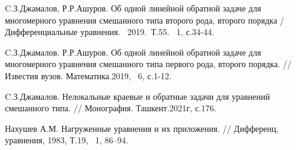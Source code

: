 \begin{thebibliography}{9} %

 C.З.Джамалов, Р.Р.Ашуров. Об одной линейной обратной задаче для многомерного уравнения смешанного типа второго рода, второго порядка / Дифференциальные уравнения. ~2019.~Т.55. \textnumero ~1, с.34-44.

 C.З.Джамалов. Р.Р.Ашуров. Об одной линейной обратной задаче для многомерного уравнения смешанного типа первого рода, второго порядка. // Известия вузов. Математика.2019, \textnumero ~6, с.1-12.

 C.З.Джамалов. Нелокальные краевые и обратные задачи для уравнений смешанного типа. // Монография. Ташкент.2021г, с.176.

 Нахушев А.М. Нагруженные уравнения и их приложения. // Дифференц, уравнения, 1983,  Т.19, \textnumero ~1, 86–94.





\end{thebibliography}




%
